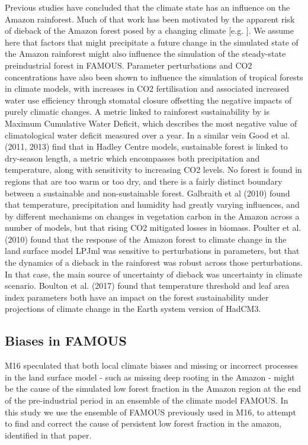\documentclass[gmd, manuscript]{copernicus}
\begin{document}
Previous studies have concluded that the climate state has an influence on the Amazon rainforest. Much of that work has been motivated by the apparent risk of dieback of the Amazon forest posed by a changing climate [e.g. \cite{malhi2008climate, cox2004amazonian}].  We assume here that factors that might precipitate a future change in the simulated state of the Amazon rainforest might also influence the simulation of the steady-state preindustrial forest in FAMOUS. Parameter perturbations and CO2 concentrations have also been shown to influence the simulation of tropical forests in climate models, with increases in CO2 fertilisation and associated increased water use efficiency through stomatal closure offsetting the negative impacts of purely climatic changes. A metric linked to rainforest sustainability by \cite{malhi2009exploring} is Maximum Cumulative Water Deficit, which describes the most negative value of climatological water deficit measured over a year. In a similar vein Good et al. (2011, 2013) find that in Hadley Centre models, sustainable forest is linked to dry-season length, a metric which encompasses both precipitation and temperature, along with sensitivity to increasing CO2 levels. No forest is found in regions that are too warm or too dry, and there is a fairly distinct boundary between a sustainable and non-sustainable forest. Galbraith et al (2010) found that temperature, precipitation and humidity had greatly varying influences, and by different mechanisms on changes in vegetation carbon in the Amazon across a number of models, but that rising CO2 mitigated losses in biomass. Poulter et al. (2010) found that the response of the Amazon forest to climate change in the land surface model LPJml was sensitive to perturbations in parameters, but that the dynamics of a dieback in the rainforest was robust across those perturbations. In that case, the main source of uncertainty of dieback was uncertainty in climate scenario. Boulton et al. (2017) found that temperature threshold and leaf area index parameters both have an impact on the forest sustainability under projections of climate change in the Earth system version of HadCM3.

\subsection{Biases in FAMOUS}

M16 speculated that both local climate biases and missing or incorrect processes in the land surface model - such as missing deep rooting in the Amazon - might be the cause of the simulated low forest fraction in the Amazon region at the end of the pre-industrial period in an ensemble of the climate model FAMOUS. In this study we use the ensemble of FAMOUS previously used in M16, to attempt to find and correct the cause of persistent low forest fraction in the amazon, identified in that paper. 
\end{document}
